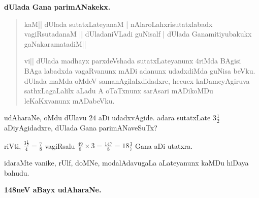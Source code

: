 \bigskip
\begin{center}
{\large\bf dUlada Gana parimANakekx.}
\end{center}
\begin{verse}
kaM|| dUlada sutatxLateyanaM | nAlaroLahxrisutatxlabadx vagiRsutadanaM
|| dUladaniVLadi guNisalf | dUlada Ganamitiyubakukx gaNakaramatadiM||

vi|| dUlada madhayx parxdeVshada sutatxLateyanunx $4$riMda BAgisi BAga
labadxda vagaRvanunx mADi adanunx udadxdiMda guNisa beVku. dUlada
maMda oMdeV samanAgilalxdidadxre, hecucx kaDameyAgiruva
sathxLagaLalilx aLadu A oTaTxnunx sarAsari mADikoMDu leKaKxvanunx mADabeVku.
\end{verse}

udAharaNe, oMdu dUlavu $24$ aDi udadxvAgide. adara sutatxLate
$3\frac{1}{2}$ aDiyAgidadxre, dUlada Gana parimANaveSuTx?

riVti, $\frac{3\frac{1}{2}}{4}=\frac{7}{8}$ vagiRsalu
$\frac{49}{8}\times 3=\frac{147}{8}=18\frac{3}{7}$ Gana aDi utatxra.

idaraMte vanike, rUlf, doMNe, modalAdavugaLa aLateyanunx kaMDu hiDaya
bahudu.

\bigskip
\begin{center}
{\Large\bf 148neV aBayx udAharaNe.}
\end{center}

